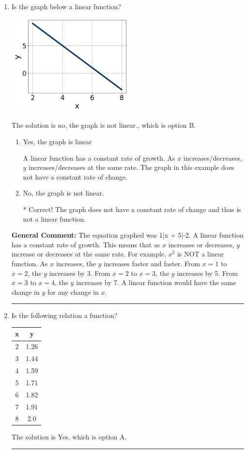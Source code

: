 \documentclass{extbook}[14pt]
\newcommand{\litem}[1]{\item #1

\rule{\textwidth}{0.4pt}}
\begin{document}
\begin{enumerate}\litem{
Is the graph below a linear function?

\begin{center}
    \includegraphics[width=0.5\textwidth]{../Figures/MA_8_F_1_2_graphQ.png}
\end{center}


The solution is no, the graph is not linear., which is option B.

\begin{enumerate}[label=\Alph*.]
\item Yes, the graph is linear

A linear function has a constant rate of growth. As $x$ increases/decreases, $y$ increases/decreases at the same rate. The graph in this example does not have a constant rate of change.
\item No, the graph is not linear.

* Correct! The graph does not have a constant rate of change and thus is not a linear function.
\end{enumerate}


\textbf{General Comment:} The equation graphed was 1|x + 5|-2. A linear function has a constant rate of growth. This means that as $x$ increases or decreases, $y$ increase or decreases at the same rate. For example, $x^2$ is NOT a linear function. As $x$ increases, the $y$ increases faster and faster. From $x=1$ to $x=2$, the $y$ increases by 3. From $x=2$ to $x=3$, the $y$ increases by 5. From $x=3$ to $x=4$, the $y$ increases by 7. A linear function would have the same change in $y$ for any change in $x$.
}
\litem{
Is the following relation a function?


\begin{tabular}{c|c}
x &y\tabularnewline \hline
2 &1.26\tabularnewline \hline
3 &1.44\tabularnewline \hline
4 &1.59\tabularnewline \hline
5 &1.71\tabularnewline \hline
6 &1.82\tabularnewline \hline
7 &1.91\tabularnewline \hline
8 &2.0\end{tabular}The solution is Yes, which is option A.

}
\end{enumerate}
\end{document}
